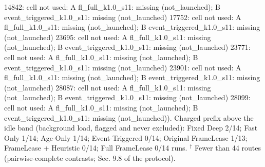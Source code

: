 \begin{table}[t]
{14842: cell not used: A fl\_full\_k1.0\_s11: missing (not\_launched); B event\_triggered\_k1.0\_s11: missing (not\_launched) \textbar{} 17752: cell not used: A fl\_full\_k1.0\_s11: missing (not\_launched); B event\_triggered\_k1.0\_s11: missing (not\_launched) \textbar{} 23695: cell not used: A fl\_full\_k1.0\_s11: missing (not\_launched); B event\_triggered\_k1.0\_s11: missing (not\_launched) \textbar{} 23771: cell not used: A fl\_full\_k1.0\_s11: missing (not\_launched); B event\_triggered\_k1.0\_s11: missing (not\_launched) \textbar{} 23901: cell not used: A fl\_full\_k1.0\_s11: missing (not\_launched); B event\_triggered\_k1.0\_s11: missing (not\_launched) \textbar{} 28087: cell not used: A fl\_full\_k1.0\_s11: missing (not\_launched); B event\_triggered\_k1.0\_s11: missing (not\_launched) \textbar{} 28099: cell not used: A fl\_full\_k1.0\_s11: missing (not\_launched); B event\_triggered\_k1.0\_s11: missing (not\_launched)). 
Charged prefix above the idle band (background load, flagged and never excluded): Fixed Deep 2/14; Fast Only 1/14; Age-Only 1/14; Event-Triggered 0/14; Original FrameLease 1/13; FrameLease + Heuristic 0/14; Full FrameLease 0/14 runs. 
$^\dagger$ Fewer than 44 routes (pairwise-complete contrasts; Sec. 9.8 of the protocol).
}
\end{table}
